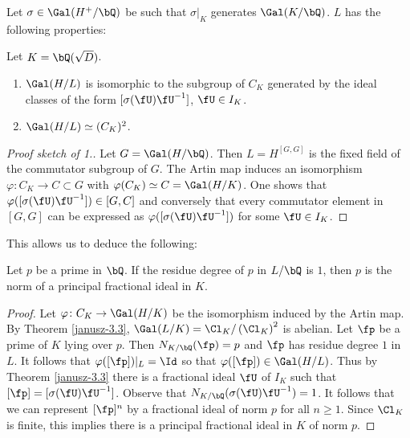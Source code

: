 Let $\sigma \in \Gal(H^{+} / \bQ)$ be such that $\sigma|_{K}$ generates $\Gal(K / \bQ)$. $L$ has the following properties:

\begin{thm}\cite[Ch. VI, $\S$3, Theorem 3.3]{Janusz}\label{janusz-3.3}
    Let $K = \bQ(\sqrt{D})$.
    \begin{enumerate}
        \item $\Gal(H / L)$ is isomorphic to the subgroup of $C_K$ generated by the ideal classes of the form $[\sigma(\fU)\fU^{-1}]$, $\fU \in I_K$. 
        \item $\Gal(H / L) \simeq (C_K)^2$. 
    \end{enumerate}
\end{thm}

\begin{proof}[Proof sketch of 1.]
    Let $G = \Gal(H / \bQ)$. Then $L = H^{[G, G]}$ is the fixed field of the commutator subgroup of $G$. The Artin map induces an isomorphism $\varphi \colon C_K \to C \subset G$ with $\varphi(C_K) \simeq C = \Gal(H / K)$. One shows that $\varphi([\sigma(\fU)\fU^{-1}]) \in [G, C]$ and conversely that every commutator element in $[G, G]$ can be expressed as $\varphi([\sigma(\fU)\fU^{-1}])$ for some $\fU \in I_K$. 
\end{proof}

This allows us to deduce the following:

\begin{thm}\label{p-principal}
Let $p$ be a prime in $\bQ$. If the residue degree of $p$ in $L / \bQ$ is $1$, then $p$ is the norm of a principal fractional ideal in $K$. 
\end{thm} 

\begin{proof}
Let $\varphi \colon C_K \to \Gal(H / K)$ be the isomorphism induced by the Artin map. By Theorem \ref{janusz-3.3}, $\Gal(L / K) = \Cl_K / \left(\Cl_K\right)^2$ is abelian. Let $\fp$ be a prime of $K$ lying over $p$. Then $N_{K / \bQ}(\fp) = p$ and $\fp$ has residue degree $1$ in $L$. It follows that $\varphi([\fp])|_{L} = \Id$ so that $\varphi([\fp]) \in \Gal(H / L)$. Thus by Theorem \ref{janusz-3.3} there is a fractional ideal $\fU$ of $I_K$ such that 
$[\fp] = [\sigma(\fU)\fU^{-1}]$. Observe that $N_{K / \bQ}(\sigma(\fU)\fU^{-1}) = 1$. It follows that we can represent $[\fp]^n$ by a fractional ideal of norm $p$ for all $n \geq 1$. Since $\Cl_K$ is finite, this implies there is a principal fractional ideal in $K$ of norm $p$. 
\end{proof}

